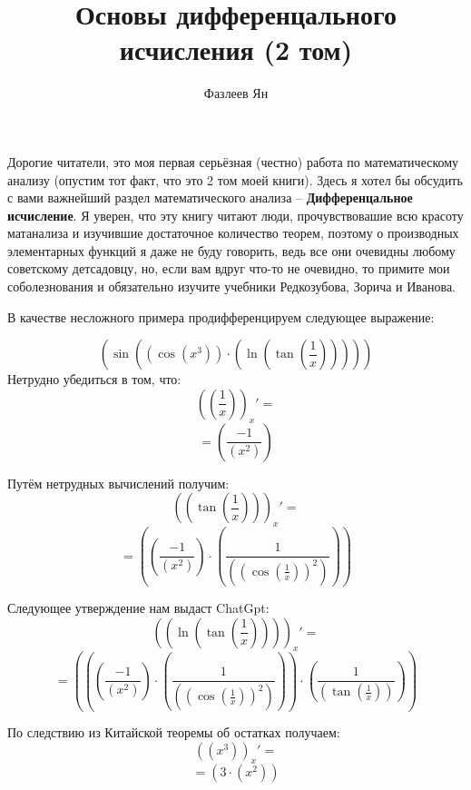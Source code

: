 \documentclass[12pt, a4paper]{article}
\title{Основы дифференцального исчисления (2 том)}
\author{Фазлеев Ян}
\begin{document}
\maketitle
\setlength{\parindent}{0pt}
\large

\hspace{1cm}Дорогие читатели, это моя первая серьёзная (честно) работа по математическому анализу (опустим тот факт, что это 2 том моей книги). Здесь я хотел бы обсудить с вами важнейший раздел математического анализа -- \textbf{Дифференцальное исчисление}. Я уверен, что эту книгу читают люди, прочувствовашие всю красоту матанализа и изучившие достаточное количество теорем, поэтому о производных элементарных функций я даже не буду говорить, ведь все они очевидны любому советскому детсадовцу, но, если вам вдруг что-то не очевидно, то примите мои соболезнования и обязательно изучите учебники Редкозубова, Зорича и Иванова.\vspace{0.5cm}

\hspace{1cm}В качестве несложного примера продифференцируем следующее выражение:

$$  (  \sin  (  {  (  \cos  (  {  {x}  }  ^  {  {  3}  }  )  )  }  \cdot {  (  \ln  (  \tan  (  \frac {  {  1}  }  {  {x}  }  )  )  )  }  )  )  $$
\hspace{1cm}Нетрудно убедиться в том, что:
$$ ( (  \frac {  {  1}  }  {  {x}  }  ) )_{x}' = $$
$$ =  (  \frac {  { -1}  }  {  (  {  {x}  }  ^  {  {  2}  }  )  }  )  $$

\hspace{1cm}Путём нетрудных вычислений получим:
$$ ( (  \tan  (  \frac {  {  1}  }  {  {x}  }  )  ) )_{x}' = $$
$$ =  (  {  (  \frac {  { -1}  }  {  (  {  {x}  }  ^  {  {  2}  }  )  }  )  }  \cdot {  (  \frac {  {  1}  }  {  (  {  (  \cos  (  \frac {  {  1}  }  {  {x}  }  )  )  }  ^  {  {  2}  }  )  }  )  }  )  $$

\hspace{1cm}Следующее утверждение нам выдаст ChatGpt:
$$ ( (  \ln  (  \tan  (  \frac {  {  1}  }  {  {x}  }  )  )  ) )_{x}' = $$
$$ =  (  {  (  {  (  \frac {  { -1}  }  {  (  {  {x}  }  ^  {  {  2}  }  )  }  )  }  \cdot {  (  \frac {  {  1}  }  {  (  {  (  \cos  (  \frac {  {  1}  }  {  {x}  }  )  )  }  ^  {  {  2}  }  )  }  )  }  )  }  \cdot {  (  \frac {  {  1}  }  {  (  \tan  (  \frac {  {  1}  }  {  {x}  }  )  )  }  )  }  )  $$

\hspace{1cm}По следствию из Китайской теоремы об остатках получаем:
$$ ( (  {  {x}  }  ^  {  {  3}  }  ) )_{x}' = $$
$$ =  (  {  {  3}  }  \cdot {  (  {  {x}  }  ^  {  {  2}  }  )  }  )  $$
\end{document}
